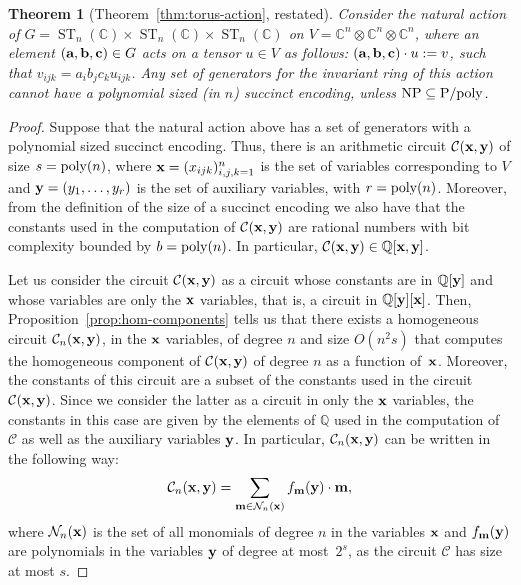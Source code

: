 \documentclass[10pt,a4paper]{article}
\newtheorem{theorem}{Theorem}
\newcommand{\C}{\mathbb C}
\newcommand{\Q}{\mathbb Q}
\newcommand{\ST}{\operatorname{ST}}
\newcommand{\cC}{\mathcal C}
\newcommand{\cN}{\mathcal N}
\newcommand{\ba}{\textbf a}
\newcommand{\bb}{\textbf b}
\newcommand{\bc}{\textbf c}
\newcommand{\bbm}{\textbf m}
\newcommand{\bx}{\textbf x}
\newcommand{\by}{\textbf y}
\begin{document}
\begin{theorem}[Theorem~\ref{thm:torus-action}, restated]
	Consider the natural action of $G = \ST_n(\C) \times \ST_n(\C) \times \ST_n(\C)$
	on $V = \C^n \otimes \C^n \otimes \C^n$, where an element
	$(\ba, \bb, \bc) \in G$ acts on a tensor $u \in V$ as follows:
  $(\ba,\bb,\bc) \cdot u := v$, such that
	$v_{ijk} = a_i b_j c_k u_{ijk}$. Any set of generators
	for the invariant ring of this action cannot have a polynomial sized
	(in $n$) succinct encoding, unless ${\rm NP \subseteq P/poly}$.
\end{theorem}

\begin{proof}
	Suppose that the natural action above has a set of generators with
	a polynomial sized succinct encoding. Thus, there is an arithmetic
	circuit $\cC(\bx, \by)$ of size $s = {\rm poly}(n)$, where
	$\bx = (x_{ijk})_{i,j,k=1}^n$ is the set of variables corresponding
	to $V$ and $\by = (y_1, \ldots, y_r)$ is the set of auxiliary
	variables, with $r = {\rm poly}(n)$.
	Moreover, from the definition of the size of a succinct encoding we also have that the
	constants used in the computation of $\cC(\bx, \by)$ are rational numbers with bit
	complexity bounded by $b = {\rm poly}(n)$. In particular, $\cC(\bx, \by) \in \Q[\bx,\by]$.

	Let us consider the circuit $\cC(\bx, \by)$ as a circuit whose constants
	are in $\Q[\by]$ and whose variables are only the $\bx$ variables,
	that is, a circuit in $\Q[\by][\bx]$.
  Then, Proposition~\ref{prop:hom-components}
	tells us that there exists a homogeneous circuit $\cC_n(\bx, \by)$,
	in the $\bx$ variables, of degree $n$ and size $O(n^2 s)$ that computes the homogeneous component of $\cC(\bx,\by)$ of degree $n$ as a function of~$\bx$.
  Moreover, the constants of this circuit are a subset of the constants used in the circuit $\cC(\bx, \by)$.
  Since we consider the latter as a circuit in only the $\bx$ variables, the constants in this case are given by the elements of $\Q$ used in the computation of
  $\cC$ as well as the auxiliary variables $\by$.
  In particular, $\cC_n(\bx, \by)$ can be written in the following way:
	\begin{equation}\label{eq:deg-n-cks-1}
		\cC_n(\bx, \by) = \sum_{\bbm \in \cN_n(\bx)} f_\bbm(\by) \cdot \bbm,
	\end{equation}
	where $\cN_n(\bx)$ is the set of all monomials of degree $n$ in the
	variables $\bx$ and $f_\bbm(\by)$ are polynomials in the variables $\by$ of
	degree at most~$2^s$, as the circuit $\cC$ has size at most $s$.


\end{proof}
\end{document}
